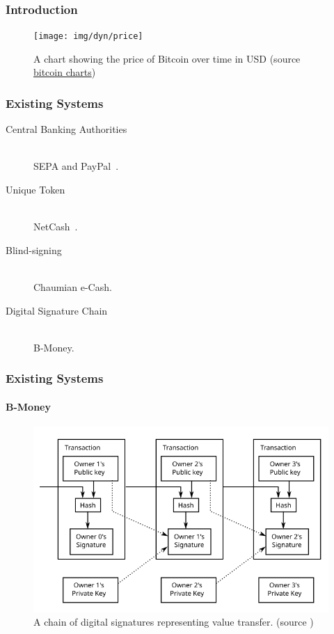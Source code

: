 \documentclass{beamer}
\title[\irptopic]{\irptitle}
\author{\irpauthor}
\institute[U of S]
{
University of Southampton \\
\medskip
{\emph{t.grainger@ecs.soton.ac.uk}}
}
\date{\today}
\begin{document}
%
\begin{frame}
\titlepage
\end{frame}
%
\begin{frame}
\frametitle{Introduction}
\begin{figure}[h!]
    \centering
    \texttt{[image: img/dyn/price]}
    \caption{A chart showing the price of Bitcoin over time in USD (source \href{http://bitcoincharts.com/}{bitcoin charts})}
    \label{fig:blockchain}
\end{figure}
\end{frame}
\begin{frame}
\frametitle{Existing Systems}
\begin{description}
    \item[Central Banking Authorities]\hfill \\
        SEPA and PayPal~\cite{paypal}.
    \item[Unique Token]\hfill \\
        NetCash~\cite{netcash}.
    \item[Blind-signing]\hfill \\
        Chaumian e-Cash\cite{chaum}.
    \item[Digital Signature Chain]\hfill \\
        B-Money\cite{b-money}.
\end{description}
\end{frame}
%

\begin{frame}
\frametitle{Existing Systems}
\framesubtitle{B-Money}

\begin{figure}[h!]
    \centering
    \includegraphics[width=0.8\columnwidth]{img/Bitcoin_Transaction_Visual}
    \caption{A chain of digital signatures representing value transfer.
    (source \protect\cite{satoshi})}
    \label{fig:chain-spend}
\end{figure}
\end{frame}
\end{document}
